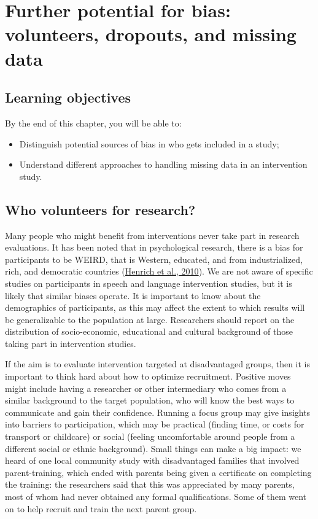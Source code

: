\documentclass{krantz}
\begin{document}
\hypertarget{dropouts}{%
\chapter{Further potential for bias: volunteers, dropouts, and missing data}\label{dropouts}}

\hypertarget{learning-objectives-8}{%
\section{Learning objectives}\label{learning-objectives-8}}

By the end of this chapter, you will be able to:

\begin{itemize}
\item
  Distinguish potential sources of bias in who gets included in a study;
\item
  Understand different approaches to handling missing data in an intervention study.
\end{itemize}

\hypertarget{who-volunteers-for-research}{%
\section{Who volunteers for research?}\label{who-volunteers-for-research}}

Many people who might benefit from interventions never take part in research evaluations. It has been noted that in psychological research, there is a bias for participants to be WEIRD, that is Western, educated, and from industrialized, rich, and democratic countries (\protect\hyperlink{ref-henrich2010}{Henrich et al., 2010}). We are not aware of specific studies on participants in speech and language intervention studies, but it is likely that similar biases operate. It is important to know about the demographics of participants, as this may affect the extent to which results will be generalizable to the population at large. Researchers should report on the distribution of socio-economic, educational and cultural background of those taking part in intervention studies.

If the aim is to evaluate intervention targeted at disadvantaged groups, then it is important to think hard about how to optimize recruitment. Positive moves might include having a researcher or other intermediary who comes from a similar background to the target population, who will know the best ways to communicate and gain their confidence. Running a focus group may give insights into barriers to participation, which may be practical (finding time, or costs for transport or childcare) or social (feeling uncomfortable around people from a different social or ethnic background). Small things can make a big impact: we heard of one local community study with disadvantaged families that involved parent-training, which ended with parents being given a certificate on completing the training: the researchers said that this was appreciated by many parents, most of whom had never obtained any formal qualifications. Some of them went on to help recruit and train the next parent group.
\end{document}
